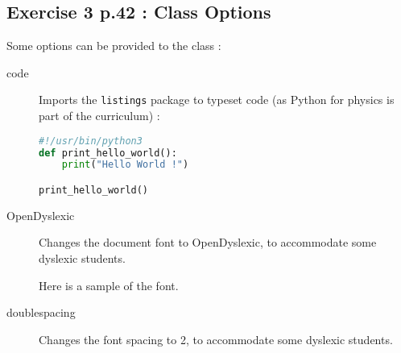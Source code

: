 \documentclass[code]{HSP-AnswerSheet}
\begin{document}
\begin{multicols*}{2}
		\subsection*{Exercise 3 p.42 : Class Options}
		Some options can be provided to the class :
		\begin{description}
			\item[code] Imports the \verb|listings| package to typeset code (as Python for physics is part of the curriculum) :
			\begin{lstlisting}[language=Python]
#!/usr/bin/python3
def print_hello_world():
	print("Hello World !")

print_hello_world()
			\end{lstlisting}
		\item[OpenDyslexic] Changes the document font to OpenDyslexic, to accommodate some dyslexic students.
		
		{ Here is a sample of the font.}
		
		\item[doublespacing] Changes the font spacing to 2, to accommodate some dyslexic students.
		\end{description}
		
	\end{multicols*}
\end{document}
